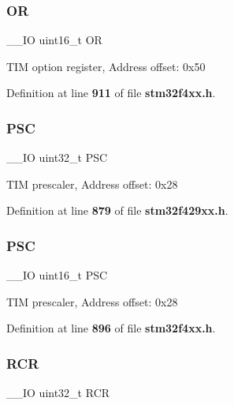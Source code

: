 \subsubsection{OR\hspace{0.1cm}{\footnotesize\ttfamily [2/2]}}
{\footnotesize\ttfamily \+\_\+\+\_\+\+IO uint16\+\_\+t OR}

T\+IM option register, Address offset\+: 0x50 

Definition at line \textbf{ 911} of file \textbf{ stm32f4xx.\+h}.

\mbox{\label{structTIM__TypeDef_a9d4c753f09cbffdbe5c55008f0e8b180}} 
\subsubsection{P\+SC\hspace{0.1cm}{\footnotesize\ttfamily [1/2]}}
{\footnotesize\ttfamily \+\_\+\+\_\+\+IO uint32\+\_\+t P\+SC}

T\+IM prescaler, Address offset\+: 0x28 

Definition at line \textbf{ 879} of file \textbf{ stm32f429xx.\+h}.

\mbox{\label{structTIM__TypeDef_aba5df4ecbb3ecb97b966b188c3681600}} 
\subsubsection{P\+SC\hspace{0.1cm}{\footnotesize\ttfamily [2/2]}}
{\footnotesize\ttfamily \+\_\+\+\_\+\+IO uint16\+\_\+t P\+SC}

T\+IM prescaler, Address offset\+: 0x28 

Definition at line \textbf{ 896} of file \textbf{ stm32f4xx.\+h}.

\mbox{\label{structTIM__TypeDef_aa1b1b7107fcf35abe39d20f5dfc230ee}} 
\subsubsection{R\+CR\hspace{0.1cm}{\footnotesize\ttfamily [1/2]}}
{\footnotesize\ttfamily \+\_\+\+\_\+\+IO uint32\+\_\+t R\+CR}

